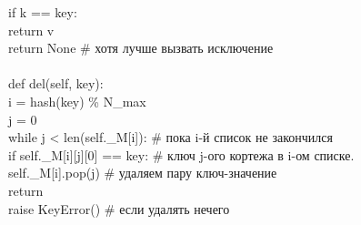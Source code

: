 {\begin{tabbing}
		\> \> \> if k == key:\\
		\> \> \> \> return v\\
		\> \> \> return None \hspace{1cm} \# хотя лучше вызвать исключение\\
		\\
		\> def del(self, key):\\
		\> \> i = hash(key) \% N\_max \\
		\> \> j = 0\\
		\> \> while j < len(self.\_M[i]): \hspace{1cm} \# пока i-й список не закончился\\ 
		\> \> \> if self.\_M[i][j][0] == key: \hspace{1cm} \# ключ j-ого кортежа в i-ом списке.\\
		\> \> \> \> self.\_M[i].pop(j) \hspace{1cm} \# удаляем пару ключ-значение\\
		\> \> \> \> return\\
		\> \> raise KeyError() \hspace{1cm} \# если удалять нечего		
	\end{tabbing}
}

